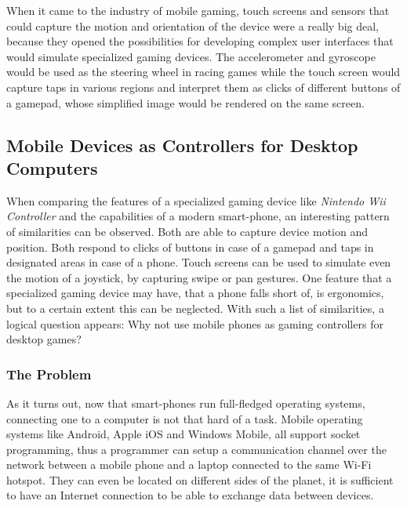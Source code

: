 When it came to the industry of mobile gaming, touch screens and sensors that
could capture the motion and orientation of the device were a really big deal,
because they opened the possibilities for developing complex user interfaces
that would simulate specialized gaming devices. The accelerometer and
gyroscope would be used as the steering wheel in racing games while the touch
screen would capture taps in various regions and interpret them as clicks of
different buttons of a gamepad, whose simplified image would be rendered on
the same screen.


\subsection{Mobile Devices as Controllers for Desktop Computers}

When comparing the features of a specialized gaming device like \emph{Nintendo
Wii Controller} and the capabilities of a modern smart-phone, an interesting
pattern of similarities can be observed. Both are able to capture device
motion and position. Both respond to clicks of buttons in case of a gamepad
and taps in designated areas in case of a phone. Touch screens can be used to
simulate even the motion of a joystick, by capturing swipe or pan gestures.
One feature that a specialized gaming device may have, that a phone falls
short of, is ergonomics, but to a certain extent this can be neglected. With
such a list of similarities, a logical question appears: Why not use mobile
phones as gaming controllers for desktop games?

\subsubsection{The Problem}

As it turns out, now that smart-phones run full-fledged operating systems,
connecting one to a computer is not that hard of a task. Mobile operating
systems like Android, Apple iOS and Windows Mobile, all support socket
programming, thus a programmer can setup a communication channel over the
network between a mobile phone and a laptop connected to the same Wi-Fi
hotspot. They can even be located on different sides of the planet, it is
sufficient to have an Internet connection to be able to exchange data between
devices.

